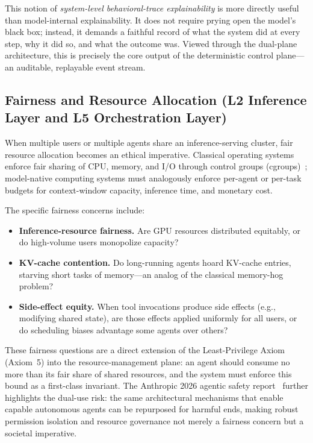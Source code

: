 \documentclass[11pt,a4paper]{article}
\begin{document}
This notion of \textit{system-level behavioral-trace explainability} is more directly useful than model-internal explainability. It does not require prying open the model's black box; instead, it demands a faithful record of what the system did at every step, why it did so, and what the outcome was. Viewed through the dual-plane architecture, this is precisely the core output of the deterministic control plane---an auditable, replayable event stream.

\subsection{Fairness and Resource Allocation (L2 Inference Layer and L5 Orchestration Layer)}
\label{sec:ethics-fairness}

When multiple users or multiple agents share an inference-serving cluster, fair resource allocation becomes an ethical imperative. Classical operating systems enforce fair sharing of CPU, memory, and I/O through control groups (cgroups)~\cite{linux_cgroup_2026}; model-native computing systems must analogously enforce per-agent or per-task budgets for context-window capacity, inference time, and monetary cost.

The specific fairness concerns include:

\begin{itemize}[nosep]
\item \textbf{Inference-resource fairness.} Are GPU resources distributed equitably, or do high-volume users monopolize capacity?
\item \textbf{KV-cache contention.} Do long-running agents hoard KV-cache entries, starving short tasks of memory---an analog of the classical memory-hog problem?
\item \textbf{Side-effect equity.} When tool invocations produce side effects (e.g., modifying shared state), are those effects applied uniformly for all users, or do scheduling biases advantage some agents over others?
\end{itemize}

These fairness questions are a direct extension of the Least-Privilege Axiom (Axiom~5) into the resource-management plane: an agent should consume no more than its fair share of shared resources, and the system must enforce this bound as a first-class invariant. The Anthropic 2026 agentic safety report~\cite{anthropic2026agenticreport} further highlights the dual-use risk: the same architectural mechanisms that enable capable autonomous agents can be repurposed for harmful ends, making robust permission isolation and resource governance not merely a fairness concern but a societal imperative.
\end{document}
